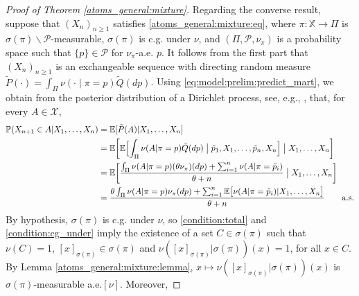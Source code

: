 \documentclass[a4paper]{article}
\theoremstyle{plain}
\theoremstyle{remark}
\theoremstyle{definition}
\begin{document}
\begin{proof}[Proof of Theorem \ref{atoms_general:mixture}]

Regarding the converse result, suppose that $(X_n)_{n\geq1}$ satisfies \eqref{atoms_general:mixture:eq}, where $\pi:\mathbb{X}\rightarrow\Pi$ is $\sigma(\pi)\backslash\mathcal{P}$-measurable, $\sigma(\pi)$ is c.g. under $\nu$, and $(\Pi,\mathcal{P},\nu_\pi)$ is a probability space such that $\{p\}\in\mathcal{P}$ for $\nu_\pi$-a.e. $p$. It follows from the first part that $(X_n)_{n\geq1}$ is an exchangeable sequence with directing random measure $\tilde{P}(\cdot)=\int_\Pi\nu(\cdot\mid\pi=p)\tilde{Q}(dp)$. Using \eqref{eq:model:prelim:predict_mart}, we obtain from the posterior distribution of a Dirichlet process, see, e.g., \cite[][eq.\,(5.3)]{ghosal2017}, that, for every $A\in\mathcal{X}$,
\begingroup\allowdisplaybreaks
\begin{align}
\mathbb{P}(X_{n+1}\in A|X_1,\ldots,X_n)&=\mathbb{E}[\tilde{P}(A)|X_1,\ldots,X_n]\nonumber\\
&=\mathbb{E}\biggl[\mathbb{E}\Bigl[\int_\Pi\nu(A|\pi=p)\tilde{Q}(dp)\;\bigr|\; \tilde{p}_1,X_1,\ldots,\tilde{p}_n,X_n\Bigr]\;\bigr|\; X_1,\ldots,X_n\biggr]\nonumber\\
&=\mathbb{E}\biggl[\frac{\int_\Pi\nu(A|\pi=p)(\theta\nu_{\pi})(dp)+\sum_{i=1}^n\nu(A|\pi=\tilde{p}_i)}{\theta+n}\;\bigr|\; X_1,\ldots,X_n\biggr]\nonumber\\
&=\frac{\theta\int_\Pi\nu(A|\pi=p)\nu_{\pi}(dp)+\sum_{i=1}^n\mathbb{E}\bigl[\nu(A|\pi=\tilde{p}_i)|X_1,\ldots,X_n\bigr]}{\theta+n}\qquad\mbox{a.s.}\label{atoms_general:mixture:proof:eq}
\end{align}
\endgroup
By hypothesis, $\sigma(\pi)$ is c.g. under $\nu$, so \eqref{condition:total} and \eqref{condition:cg_under} imply the existence of a set $C\in\sigma(\pi)$ such that $\nu(C)=1$, $[x]_{\sigma(\pi)}\in\sigma(\pi)$ and $\nu([x]_{\sigma(\pi)}|\sigma(\pi))(x)=1$, for all $x\in C$. By Lemma \ref{atoms_general:mixture:lemma}, $x\mapsto\nu([x]_{\sigma(\pi)}|\sigma(\pi))(x)$ is $\sigma(\pi)$-measurable a.e.$[\nu]$. Moreover,

\end{proof}
\end{document}
